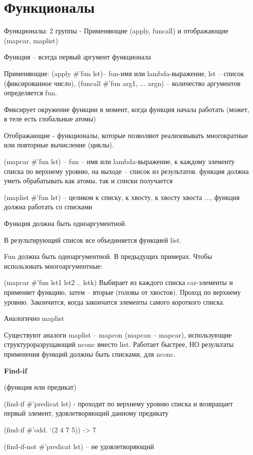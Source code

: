 \documentclass[12pt]{report}
\begin{document}
\section*{Функционалы}
Функционалы: 2 группы - Применяющие (apply,  funcall) и отображающие (mapcar, maplist)

Функция – всегда первый аргумент функционала



Применяющие: (apply \#'fun lst)--  fun-имя или lambda-выражение, lst -- список (фиксированное число), (funcall \#'fun arg1, ... argn) -- количество аргументов определяется fun.

Фиксирует окружение функции в момент, когда функция начала работать (может, в теле есть глобальные атомы)


Отображающие -  функционалы, которые позволяют реализовывать многократные или повторные вычисление (циклы).

(mapcar \#'fun lst) -- fun -- имя или lambda-выражение, к каждому элементу списка по верхнему уровню, на выходе -- список из результатов. функция должна уметь обрабатывать как атомы, так и списки получается

(maplist \#'fun lst) -- целиком к списку, к хвосту, к хвосту хвоста ..., функция должна работать со списками

Функция должна быть одноаргументной.

В результирующий список все объединяется функцией list. 

Fun должна быть одноаргументной. В предыдущих примерах. Чтобы использовать многоаргументные:

(mapcar \#’fun lst1 lst2 .. lstk)
Выбирает из каждого списка car-элементы и применяет функцию, затем – вторые (головы от хвостов). Проход по верхнему уровню. Закончится, когда закончатся элементы самого короткого списка. 

Аналогично maplist

Существуют аналоги maplist -- mapcon (mapcan -- mapcar), использующие структуроразрущающий nconc вместо list. Работает быстрее, НО результаты применения функций должны быть списками, для nconc.


\textbf{Find-if}

(функция или предикат)

(find-if  \#’predicat lst) - проходит по верхнему уровню списка и возвращает первый элемент, удовлетворяющий данному предикату

(find-if \#’odd. ‘(2 4 7 5)) -> 7

(find-if-not \#’predicat lst) – не удовлетворяющий
\end{document}
